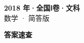 \documentclass[zihao=-4, a4paper]{ctexart}
\begin{document}
\begin{center}
  {\Large\bfseries 2018 年·全国Ⅰ卷·文科}\\[4pt]
  {\large 数学 · 简答版}
\end{center}
\medskip
{}

\clearpage
{}
\begin{center}{\Large\bfseries 答案速查}\end{center}
\medskip

\end{document}
